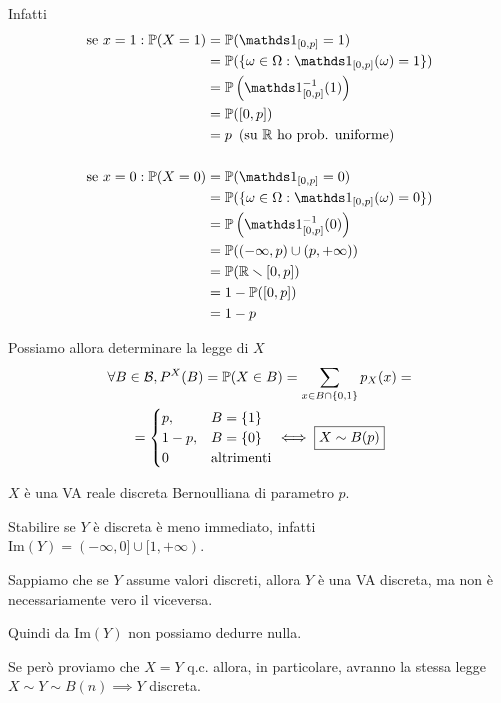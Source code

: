 \begin{enumerate}
Infatti\begin{equation*}
\begin{aligned}
\text{se} \ x=1:\PP( X=1) & =\PP(\Ind_{[ 0,p]} =1)\\
 & =\PP(\{\omega \in \Omega :\Ind_{[ 0,p]}( \omega ) =1\})\\
 & =\PP\left(\Ind_{[ 0,p]}^{-1}( 1)\right)\\
 & =\PP([ 0,p])\\
 & =p\ \left(\text{su} \ \mathbb{R} \ \text{ho prob. uniforme}\right)\\
 & \\
\text{se} \ x=0:\PP( X=0) & =\PP(\Ind_{[ 0,p]} =0)\\
 & =\PP(\{\omega \in \Omega :\Ind_{[ 0,p]}( \omega ) =0\})\\
 & =\PP\left(\Ind_{[ 0,p]}^{-1}( 0)\right)\\
 & =\PP(( -\infty ,p) \cup ( p,+\infty ))\\
 & =\PP(\mathbb{R} \smallsetminus [ 0,p])\\
 & =1-\PP([ 0,p])\\
 & =1-p
\end{aligned}
\end{equation*}

Possiamo allora determinare la legge di $X$\begin{gather*}
\forall B\in \mathcal{B} ,P^{X}( B) =\mathbb{P}( X\in B) =\sum\limits _{x\in B\cap \{0,1\}} p_{X}( x) =\\
=\begin{cases}
p, & B=\{1\}\\
1-p, & B=\{0\}\\
0 & \text{altrimenti}
\end{cases} \iff \boxed{X\sim B( p)}
\end{gather*}

$X$ è una VA reale discreta Bernoulliana di parametro $p$.

Stabilire se $Y$ è discreta è meno immediato, infatti $\mathrm{Im}( Y) =( -\infty ,0] \cup [ 1,+\infty )$.

\begin{oss}
Sappiamo che se $Y$ assume valori discreti, allora $Y$ è una VA discreta, ma non è necessariamente vero il viceversa.
\end{oss}

Quindi da $\mathrm{Im}( Y)$ non possiamo dedurre nulla.

Se però proviamo che $X=Y$ q.c. allora, in particolare, avranno la stessa legge $X\sim Y\sim B( n) \implies Y$ discreta.


\end{enumerate}
